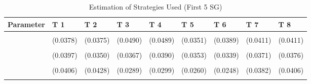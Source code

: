 \begin{table}[!h]
\centering
\caption{Estimation of Strategies Used (First 5 SG)}
\centering
\begin{tabular}[t]{lllllllll}
\toprule
Parameter & T 1 & T 2 & T 3 & T 4 & T 5 & T 6 & T 7 & T 8\\
\midrule
\cellcolor{gray!10}{gamma} & \cellcolor{gray!10}{0.7419***} & \cellcolor{gray!10}{0.6971***} & \cellcolor{gray!10}{0.9285***} & \cellcolor{gray!10}{0.8708***} & \cellcolor{gray!10}{0.7710***} & \cellcolor{gray!10}{0.8051***} & \cellcolor{gray!10}{0.7506***} & \cellcolor{gray!10}{0.8433***}\\
 & (0.0378) & (0.0375) & (0.0490) & (0.0489) & (0.0351) & (0.0389) & (0.0411) & (0.0411)\\
\cellcolor{gray!10}{AD} & \cellcolor{gray!10}{0.3513***} & \cellcolor{gray!10}{0.3029***} & \cellcolor{gray!10}{0.7235***} & \cellcolor{gray!10}{0.6688***} & \cellcolor{gray!10}{0.6359***} & \cellcolor{gray!10}{0.6998***} & \cellcolor{gray!10}{0.3335***} & \cellcolor{gray!10}{0.3448***}\\
 & (0.0397) & (0.0350) & (0.0367) & (0.0390) & (0.0353) & (0.0339) & (0.0371) & (0.0376)\\
\cellcolor{gray!10}{AC} & \cellcolor{gray!10}{0.2000***} & \cellcolor{gray!10}{0.3035***} & \cellcolor{gray!10}{0.1909***} & \cellcolor{gray!10}{0.1830***} & \cellcolor{gray!10}{0.1530***} & \cellcolor{gray!10}{0.1433***} & \cellcolor{gray!10}{0.2644***} & \cellcolor{gray!10}{0.2592***}\\
\addlinespace
 & (0.0406) & (0.0428) & (0.0289) & (0.0299) & (0.0260) & (0.0248) & (0.0382) & (0.0406)\\
\cellcolor{gray!10}{G} & \cellcolor{gray!10}{0.4488***} & \cellcolor{gray!10}{0.3936***} & \cellcolor{gray!10}{0.0856**} & \cellcolor{gray!10}{0.1481***} & \cellcolor{gray!10}{0.2111***} & \cellcolor{gray!10}{0.1568***} & \cellcolor{gray!10}{0.4022***} & \cellcolor{gray!10}{0.3960***}\\
\bottomrule
\end{tabular}
\end{table}